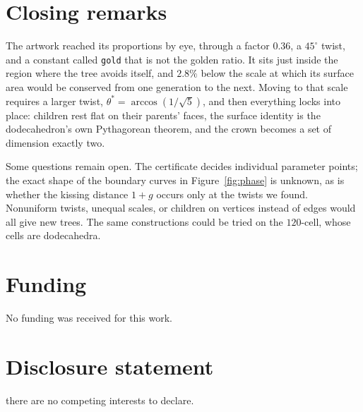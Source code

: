 \documentclass[12pt]{article}
\theoremstyle{plain}
\theoremstyle{remark}
\begin{document}
\section{Closing remarks}

The artwork reached its proportions by eye, through a factor $0.36$, a
$45^\circ$ twist, and a constant called \texttt{gold} that is not the golden
ratio.  It sits just inside the region where the tree avoids itself, and
$2.8\%$ below the scale at which its surface area would be conserved from one
generation to the next.  Moving to that scale requires a larger twist,
$\theta^*=\arccos(1/\sqrt5)$, and then everything locks into place: children
rest flat on their parents' faces, the surface identity is the dodecahedron's
own Pythagorean theorem, and the crown becomes a set of dimension exactly two.

Some questions remain open.  The certificate decides individual parameter
points; the exact shape of the boundary curves in Figure~\ref{fig:phase} is
unknown, as is whether the kissing distance $1+g$ occurs only at the twists
we found.  Nonuniform twists, unequal scales, or children on vertices
instead of edges would all give new trees.  The same constructions could be
tried on the $120$-cell, whose cells are dodecahedra.


\section*{Funding}
No funding was received for this work.

\section*{Disclosure statement}
 there are no competing interests to declare.
\end{document}
